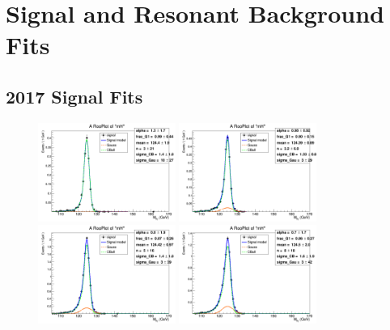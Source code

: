 \chapter{Signal and Resonant Background Fits}

\section{2017 Signal Fits}

\begin{figure}
	\begin{center}
		\includegraphics[width=0.40\textwidth]{fig/signal_fit/2017/sigfit_ele_ggF_1_125.png}
		\includegraphics[width=0.40\textwidth]{fig/signal_fit/2017/sigfit_ele_ggF_2_125.png}\\
		\includegraphics[width=0.40\textwidth]{fig/signal_fit/2017/sigfit_ele_ggF_3_125.png}
		\includegraphics[width=0.40\textwidth]{fig/signal_fit/2017/sigfit_ele_ggF_4_125.png}\\

\end{center}
\end{figure}
